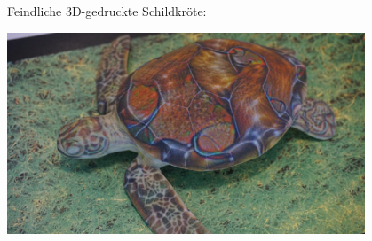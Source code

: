 \documentclass[aspectratio=169,x11names]{beamer}
\begin{document}
\begin{frame}

\begin{center}
Feindliche 3D-gedruckte Schildkröte:
\end{center}

\begin{center}
\includegraphics[width=0.8\textwidth]{images/rifle_turtle.jpg} 
\end{center}
\end{frame}

\end{document}
